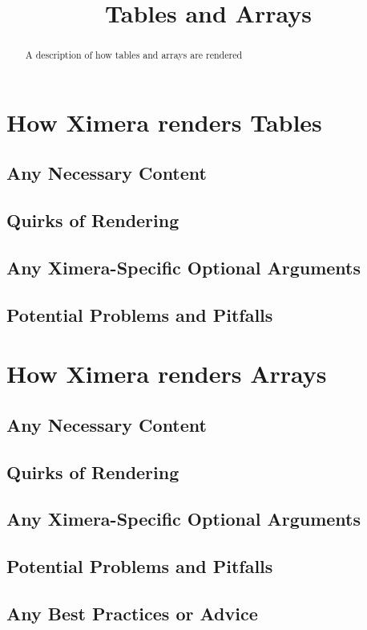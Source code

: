 \documentclass{ximera}
\title{Tables and Arrays}
\begin{document}
\begin{abstract}
    A description of how tables and arrays are rendered
\end{abstract}
\maketitle


\section*{How Ximera renders Tables}
    \subsection*{Any Necessary Content}
    
    
    
    \subsection*{Quirks of Rendering}
    
    
    
    \subsection*{Any Ximera-Specific Optional Arguments}
    
    
    
    \subsection*{Potential Problems and Pitfalls}
    
    
    
\section*{How Ximera renders Arrays}
    \subsection*{Any Necessary Content}
    
    
    
    \subsection*{Quirks of Rendering}
    
    
    
    \subsection*{Any Ximera-Specific Optional Arguments}
    
    
    
    \subsection*{Potential Problems and Pitfalls}
    
    
    \subsection*{Any Best Practices or Advice}
    
    
    
\end{document}
